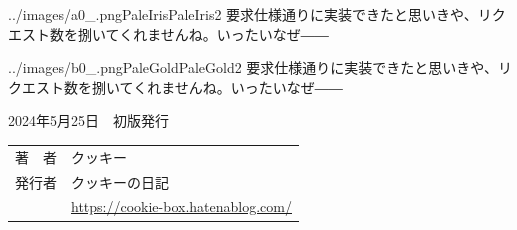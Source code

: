 \documentclass[b5paper,xelatex,ja=standard,11pt]{bxjsarticle}
\begin{document}
\begin{SERIFU}[enlarge top by=3pt]{../images/a0_.png}{PaleIris}{PaleIris2}
要求仕様通りに実装できたと思いきや、リクエスト数を捌いてくれませんね。いったいなぜ――
\end{SERIFU}

\begin{SERIFU}[enlarge bottom by=5pt]{../images/b0_.png}{PaleGold}{PaleGold2}
要求仕様通りに実装できたと思いきや、リクエスト数を捌いてくれませんね。いったいなぜ――
\end{SERIFU}


\clearpage
\vspace*{0.75\textheight}
\begin{OKUDUKE}[title={\large\bf \mybooktitle}]
2024年5月25日　初版発行
\tcblower
\renewcommand\arraystretch{0.95}
\begin{tabular}{rp{10cm}}
著　者 & クッキー \\
発行者 & クッキーの日記 \\
& \url{https://cookie-box.hatenablog.com/} 
\end{tabular}
\end{OKUDUKE}
\thispagestyle{empty}
\end{document}
